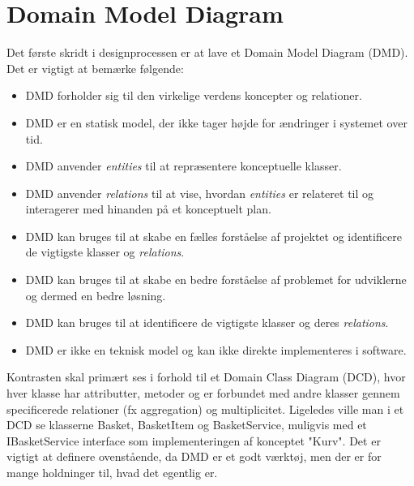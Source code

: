 \section{Domain Model Diagram}
\label{sec:domain-model-diagram}
Det første skridt i designprocessen er at lave et Domain Model Diagram (DMD). Det er vigtigt at bemærke følgende:
\begin{itemize}
    \item DMD forholder sig til den virkelige verdens koncepter og relationer.
    \item DMD er en statisk model, der ikke tager højde for ændringer i systemet over tid.
    \item DMD anvender \emph{entities} til at repræsentere konceptuelle klasser.
    \item DMD anvender \emph{relations} til at vise, hvordan \emph{entities} er relateret til og interagerer med hinanden på et konceptuelt plan.
    \item DMD kan bruges til at skabe en fælles forståelse af projektet og identificere de vigtigste klasser og \emph{relations}.
    \item DMD kan bruges til at skabe en bedre forståelse af problemet for udviklerne og dermed en bedre løsning.
    \item DMD kan bruges til at identificere de vigtigste klasser og deres \emph{relations}.
    \item DMD er ikke en teknisk model og kan ikke direkte implementeres i software.
\end{itemize}
Kontrasten skal primært ses i forhold til et Domain Class Diagram (DCD), hvor hver klasse har attributter, metoder og er forbundet med andre klasser gennem specificerede relationer (fx aggregation) og multiplicitet.
Ligeledes ville man i et DCD se klasserne Basket, BasketItem og BasketService, muligvis med et IBasketService interface som implementeringen af konceptet "Kurv".
Det er vigtigt at definere ovenstående, da DMD er et godt værktøj, men der er for mange holdninger til, hvad det egentlig er.


